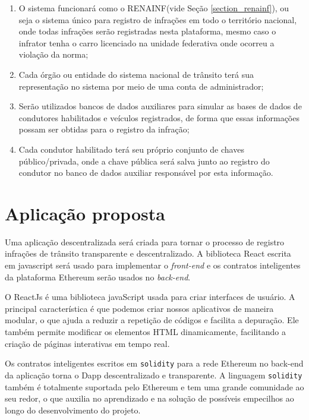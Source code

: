     \begin{enumerate}
        \item O sistema funcionará como o RENAINF(vide Seção \ref{section_renainf}), ou seja o sistema único para registro de infrações em todo o território nacional, onde todas infrações serão registradas nesta plataforma, mesmo caso o infrator tenha o carro licenciado na unidade federativa onde ocorreu a violação da norma;
        \item Cada órgão ou entidade do sistema nacional de trânsito terá sua representação no sistema por meio de uma conta de administrador;
        \item Serão utilizados bancos de dados auxiliares para simular as bases de dados de condutores habilitados e veículos registrados, de forma que essas informações possam ser obtidas para o registro da infração;
        \item Cada condutor habilitado terá seu próprio conjunto de chaves público/privada, onde a chave pública será salva junto ao registro do condutor no banco de dados auxiliar responsável por esta informação.
    \end{enumerate}


\section{Aplicação proposta}

Uma aplicação descentralizada será criada para tornar o processo de registro infrações de trânsito transparente e descentralizado. A biblioteca React escrita em javascript será usado para implementar o \textit{front-end} e os contratos inteligentes da plataforma Ethereum serão usados no \textit{back-end}. 

O ReactJs é uma biblioteca javaScript usada para criar interfaces de usuário. A principal característica é que podemos criar nossos aplicativos de maneira modular, o que ajuda a reduzir a repetição de códigos e facilita a depuração. Ele também permite modificar os elementos HTML dinamicamente, facilitando a criação de páginas interativas em tempo real. 

Os contratos inteligentes escritos em \verb|solidity| para a rede Ethereum no back-end da aplicação torna o Dapp descentralizado e transparente. A linguagem \verb|solidity| também é totalmente suportada pelo Ethereum e tem uma grande comunidade ao seu redor, o que auxilia no aprendizado e na solução de possíveis empecilhos ao longo do desenvolvimento do projeto.

